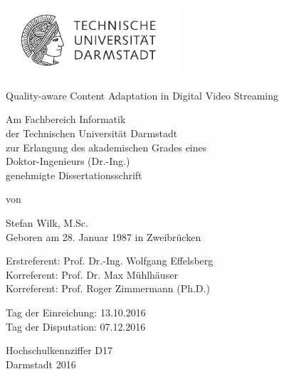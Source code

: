 %
\begin{titlepage}

    \begin{center}

        \hfill

        \vfill

				\includegraphics[height=26mm]{gfx/orga/tud_logo} \\%
        
        \vfill

				Quality-aware Content Adaptation in Digital Video Streaming %

        
        \vfill

        Am Fachbereich Informatik \\ %
				der Technischen Universit\"at Darmstadt \\
				zur Erlangung des akademischen Grades eines \\
				Doktor-Ingenieurs (Dr.-Ing.) \\
				genehmigte Dissertationsschrift \\ \medskip %
				
				von \\ \medskip
        
        Stefan Wilk, M.Sc. \\
        Geboren am 28. Januar 1987 in Zweibr\"ucken

        \vfill

			  Erstreferent: Prof. Dr.-Ing. Wolfgang Effelsberg  \\
			  Korreferent: Prof. Dr. Max M\"uhlh\"auser \\
			  Korreferent: Prof. Roger Zimmermann (Ph.D.) \\
        \vfill

        Tag der Einreichung: 13.10.2016 \\ 
        Tag der Disputation: 07.12.2016\\
        
        \vfill       
       
        Hochschulkennziffer D17 \\
        Darmstadt 2016
%         

        \vfill                      

    \end{center} 
\end{titlepage}   